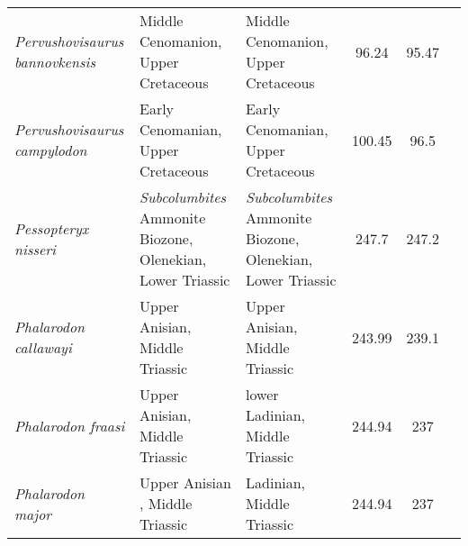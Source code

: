 \begin{longtabu}{>{\itshape}lXXSSl}
	Pervushovisaurus bannovkensis                        & Middle Cenomanion, Upper Cretaceous                                                                                                & Middle Cenomanion, Upper Cretaceous                                                                                                & 96.24                    & 95.47                    & \cite{Fischer2014b} \\                   
	Pervushovisaurus campylodon                          & Early Cenomanian, Upper Cretaceous                                                                                                 & Early Cenomanian, Upper Cretaceous                                                                                                 & 100.45                   & 96.5                     & \cite{Fischer2016} \\                    
	Pessopteryx nisseri                                  & \emph{Subcolumbites} Ammonite Biozone, Olenekian, Lower Triassic                                                                   & \emph{Subcolumbites} Ammonite Biozone, Olenekian, Lower Triassic                                                                   & 247.7                    & 247.2                    & \cite{Wiman1910} \\                      
	Phalarodon callawayi                                 & Upper Anisian, Middle Triassic                                                                                                     & Upper Anisian, Middle Triassic                                                                                                     & 243.99                   & 239.1                    & \cite{Schmitz2004} \\                    
	Phalarodon fraasi                                    & Upper Anisian, Middle Triassic                                                                                                     & lower Ladinian, Middle Triassic                                                                                                    & 244.94                   & 237                      & \cite{Merriam1910} \\                    
	Phalarodon major                                     & Upper Anisian , Middle Triassic                                                                                                    & Ladinian, Middle Triassic                                                                                                          & 244.94                   & 237                      & \cite{Maisch2005} \\                     

\end{longtabu}
